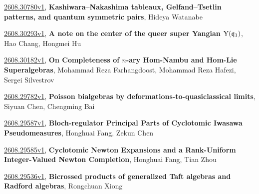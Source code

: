\documentclass[9pt, a4paper]{article}
\theoremstyle{plain}
\theoremstyle{definition}
\theoremstyle{remark}
\newcommand{\arxiv}[3]{\href{https://arxiv.org/abs/#1}{#1}, \textbf{\textcolor{arxivblue}{#2}}, #3}
\begin{document}
\arxiv{2608.30780v1}{Kashiwara--Nakashima tableaux, Gelfand--Tsetlin patterns, and quantum symmetric pairs}{Hideya Watanabe}

\arxiv{2608.30293v1}{A note on the center of the queer super Yangian ${\rm Y}(\mathfrak{q}_1)$}{Hao Chang, Hongmei Hu}

\arxiv{2608.30182v1}{On Completeness of $n$-ary Hom-Nambu and Hom-Lie Superalgebras}{Mohammad Reza Farhangdoost, Mohammad Reza Hafezi, Sergei Silvestrov}

\arxiv{2608.29782v1}{Poisson bialgebras by deformations-to-quasiclassical limits}{Siyuan Chen, Chengming Bai}

\arxiv{2608.29587v1}{Bloch-regulator Principal Parts of Cyclotomic Iwasawa Pseudomeasures}{Honghuai Fang, Zekun Chen}

\arxiv{2608.29585v1}{Cyclotomic Newton Expansions and a Rank-Uniform Integer-Valued Newton Completion}{Honghuai Fang, Tian Zhou}

\arxiv{2608.29536v1}{Bicrossed products of generalized Taft algebras and Radford algebras}{Rongchuan Xiong}

\end{document}
